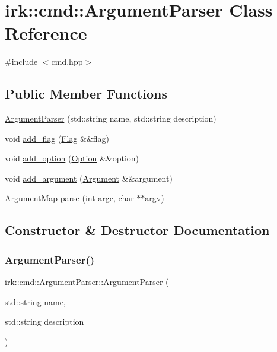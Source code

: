 \hypertarget{classirk_1_1cmd_1_1ArgumentParser}{}\section{irk\+:\+:cmd\+:\+:Argument\+Parser Class Reference}
\label{classirk_1_1cmd_1_1ArgumentParser}


{\ttfamily \#include $<$cmd.\+hpp$>$}

\subsection*{Public Member Functions}
\begin{DoxyCompactItemize}
\item 
\mbox{\hyperlink{classirk_1_1cmd_1_1ArgumentParser_abbb686cd0dbc85611af0af11af634c27}{Argument\+Parser}} (std\+::string name, std\+::string description)
\item 
void \mbox{\hyperlink{classirk_1_1cmd_1_1ArgumentParser_aaca956801455aec761e6073c38026b88}{add\+\_\+flag}} (\mbox{\hyperlink{classirk_1_1cmd_1_1Flag}{Flag}} \&\&flag)
\item 
void \mbox{\hyperlink{classirk_1_1cmd_1_1ArgumentParser_a8e1fd0bb29028d37218192cacde3ad10}{add\+\_\+option}} (\mbox{\hyperlink{classirk_1_1cmd_1_1Option}{Option}} \&\&option)
\item 
void \mbox{\hyperlink{classirk_1_1cmd_1_1ArgumentParser_a4560ff8b45af191c348a2f707e5d37c7}{add\+\_\+argument}} (\mbox{\hyperlink{classirk_1_1cmd_1_1Argument}{Argument}} \&\&argument)
\item 
\mbox{\hyperlink{classirk_1_1cmd_1_1ArgumentMap}{Argument\+Map}} \mbox{\hyperlink{classirk_1_1cmd_1_1ArgumentParser_aed26f679bf50e0e86789153d6871713f}{parse}} (int argc, char $\ast$$\ast$argv)
\end{DoxyCompactItemize}


\subsection{Constructor \& Destructor Documentation}
\mbox{\label{classirk_1_1cmd_1_1ArgumentParser_abbb686cd0dbc85611af0af11af634c27}} 
\subsubsection{\texorpdfstring{Argument\+Parser()}{ArgumentParser()}}
{\footnotesize\ttfamily irk\+::cmd\+::\+Argument\+Parser\+::\+Argument\+Parser (\begin{DoxyParamCaption}\item[{std\+::string}]{name,  }\item[{std\+::string}]{description }\end{DoxyParamCaption})\hspace{0.3cm}{\ttfamily [inline]}}



